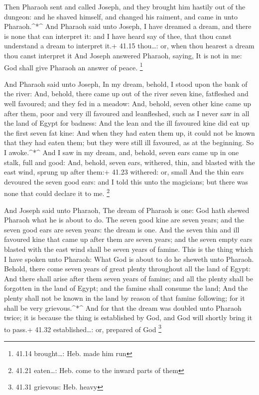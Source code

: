  Then Pharaoh sent and called Joseph, and they brought him
hastily out of the dungeon: and he shaved himself, and changed his
raiment, and came in unto Pharaoh.\^{}*\^{}  And Pharaoh
said unto Joseph, I have dreamed a dream, and there is none that can
interpret it: and I have heard say of thee, that thou canst understand a
dream to interpret it.+ 41.15 thou\ldots: or, when thou hearest a dream
thou canst interpret it  And Joseph answered Pharaoh,
saying, It is not in me: God shall give Pharaoh an answer of peace.
\footnote{41.14 brought\ldots: Heb. made him run}

 And Pharaoh said unto Joseph, In my dream, behold, I stood
upon the bank of the river:  And, behold, there came up out
of the river seven kine, fatfleshed and well favoured; and they fed in a
meadow:  And, behold, seven other kine came up after them,
poor and very ill favoured and leanfleshed, such as I never saw in all
the land of Egypt for badness:  And the lean and the ill
favoured kine did eat up the first seven fat kine:  And
when they had eaten them up, it could not be known that they had eaten
them; but they were still ill favoured, as at the beginning. So I
awoke.\^{}*\^{}  And I saw in my dream, and, behold, seven
ears came up in one stalk, full and good:  And, behold,
seven ears, withered, thin, and blasted with the east wind, sprung up
after them:+ 41.23 withered: or, small  And the thin ears
devoured the seven good ears: and I told this unto the magicians; but
there was none that could declare it to me. \footnote{41.21 eaten\ldots:
  Heb. come to the inward parts of them}

 And Joseph said unto Pharaoh, The dream of Pharaoh is one:
God hath shewed Pharaoh what he is about to do.  The seven
good kine are seven years; and the seven good ears are seven years: the
dream is one.  And the seven thin and ill favoured kine
that came up after them are seven years; and the seven empty ears
blasted with the east wind shall be seven years of famine. 
This is the thing which I have spoken unto Pharaoh: What God is about to
do he sheweth unto Pharaoh.  Behold, there come seven years
of great plenty throughout all the land of Egypt:  And
there shall arise after them seven years of famine; and all the plenty
shall be forgotten in the land of Egypt; and the famine shall consume
the land;  And the plenty shall not be known in the land by
reason of that famine following; for it shall be very grievous.\^{}*\^{}
 And for that the dream was doubled unto Pharaoh twice; it
is because the thing is established by God, and God will shortly bring
it to pass.+ 41.32 established\ldots: or, prepared of God \footnote{41.31
  grievous: Heb. heavy}

